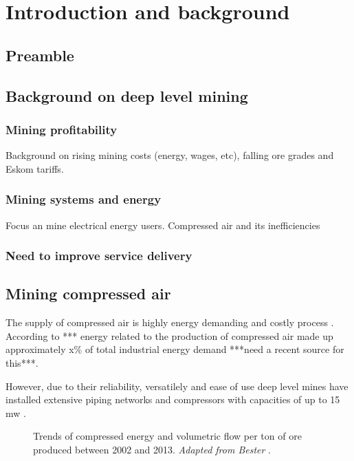 \chapter{Introduction and background}  %
\setcounter{page}{1}
\section{Preamble}

\section{Background on deep level mining}

\subsection{Mining profitability}
Background on rising mining costs (energy, wages, etc), falling ore grades and Eskom tariffs.\cite{neingo2016trends}
%	


\subsection{Mining systems and energy}
Focus an mine electrical energy users. Compressed air and its inefficiencies
\subsection{Need to improve service delivery}
\section{Mining compressed air}
The supply of compressed air is highly energy demanding and costly process \cite{padachi2009energy}.  According to *** energy related to the production of compressed air made up approximately x\% of total industrial energy demand ***need a recent source for this***. \par
However, due to their reliability, versatilely and ease of use deep level mines have installed extensive piping networks and compressors with capacities of up to 15 \gls{mw} \cite{Marais2012PhD}.

\begin{figure}
	\centering
	
	\caption{Trends of compressed energy and volumetric flow per ton of ore produced between 2002 and 2013. \textit{Adapted from Bester} \cite{bester2013effect}.}
	\label{fig: Compressed energy and volumetric flow per ton}
\end{figure}


